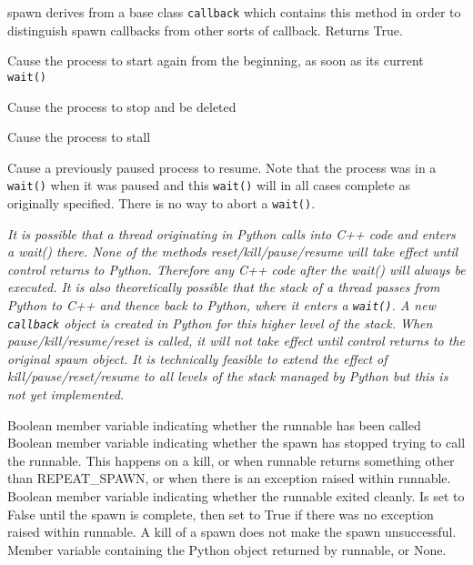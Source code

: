 \documentclass[12pt,oneside]{gsbook}
\begin{document}
\begin{methods}

 {spawn derives from a base class \texttt{callback}
which contains this method in order to distinguish spawn callbacks from
other sorts of callback.  Returns True.}

 {Cause the process to start again from the
beginning, as soon as its current \texttt{wait()} }

 {Cause the process to stop and be deleted}

 {Cause the process to stall}

 {Cause a previously paused process to resume.  Note
that the process was in a \texttt{wait()} when it was paused and this
\texttt{wait()} will in all cases complete as originally specified.
There is no way to abort a \texttt{wait()}.}

 {{\em It is possible that a thread originating in
Python calls into C++ code and enters a wait() there.  None of the
methods reset/kill/pause/resume will take effect until control
returns to Python.  Therefore any C++ code after the wait() will
always be executed.  It is also theoretically possible
that the stack of a thread passes from Python to C++ and thence back
to Python, where it enters a \texttt{wait()}.  A new \texttt{callback}
object is created in Python for this higher level of the stack.  When
pause/kill/resume/reset is called, it will not
take effect until control returns to the original spawn object.  It
is technically feasible to extend the effect of kill/pause/reset/resume
to all levels of the stack {\em managed by Python} but this is not
yet implemented.}}

\end{methods}

\begin{members}
 { Boolean member variable indicating whether the
runnable has been called }
 { Boolean member variable indicating whether the
spawn has stopped trying to call the runnable.  This happens on a
kill, or when runnable returns something other than REPEAT\_SPAWN,
or when there is an exception raised within runnable. }
 { Boolean member variable indicating whether the
runnable exited cleanly.  Is set to False until the spawn is complete,
then set to True if there was no exception raised within runnable.  A
kill of a spawn does not make the spawn unsuccessful. }
 { Member variable containing the Python
object returned by runnable, or None. }
\end{members}
\end{document}
